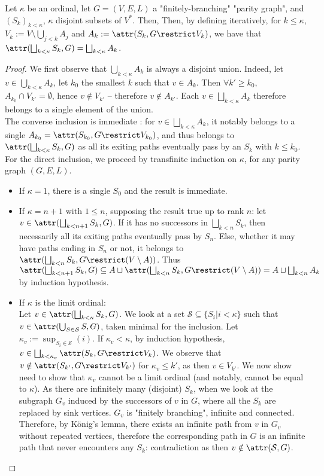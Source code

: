 \documentclass[a4paper,UKenglish,cleveref, autoref, thm-restate]{lipics-v2021}
\renewcommand{\S}{\mathcal{S}}
\renewcommand{\leq}{\leqslant}
\renewcommand{\geq}{\geqslant}
\begin{document}
\begin{lemma}\label{lem:attr-union}
	Let $\kappa$ be an ordinal, let $G=(V,E,L)$ a "finitely-branching" "parity graph", and $(S_k)_{k<\kappa}$, $\kappa$ disjoint subsets of $V^*$. Then, Then, by defining iteratively, for $k \leq \kappa$, $V_k:=V\setminus \bigcup_{j< k}A_j$ and $A_k := \attr(S_k,G\restrict V_k)$, we have that $\attr(\bigsqcup_{k<\kappa}S_k,G) = \bigsqcup_{k<\kappa} A_k$.
\end{lemma}
\begin{proof}
	We first observe that $\bigcup_{k<\kappa} A_k$ is always a disjoint union. Indeed, let $v\in \bigcup_{k<\kappa} A_k$, let $k_0$ the smallest $k$ such that $v\in A_k$. Then $\forall k' \geq k_0$, $A_{k_0} \cap V_{k'} = \emptyset$, hence $v \notin V_{k'}$ – therefore $v\notin A_{k'}$. Each $v \in \bigsqcup_{k<\kappa} A_k$ therefore belongs to a single element of the union.\\
	The converse inclusion is immediate : for $v\in \bigsqcup_{k<\kappa} A_k$, it notably belongs to a single $A_{k_0} = \attr(S_{k_0},G\restrict V_{k_0})$, and thus belongs to $\attr(\bigsqcup_{k<\kappa}S_k,G)$ as all its exiting paths eventually pass by an $S_k$ with $k\leq k_0$.\\
	For the direct inclusion, we proceed by transfinite induction on $\kappa$, for any parity graph $(G,E,L)$.
	\begin{itemize}
		\item If $\kappa = 1$, there is a single $S_0$ and the result is immediate.
		\item If $\kappa = n+1$ with $1\leq n$, supposing the result true up to rank $n$:
		let $v\in \attr(\bigsqcup_{k<n+1}S_k,G)$. If it has no successors in $\bigsqcup_{k<n}S_k$, then necessarily all its exiting paths eventually pass by $S_n$. Else, whether it may have paths ending in $S_n$ or not, it belongs to $\attr(\bigsqcup_{k<n}S_k,G\restrict (V \setminus A))$. Thus $\attr(\bigsqcup_{k<n+1}S_k,G) \subseteq A \sqcup \attr(\bigsqcup_{k<n}S_k,G\restrict (V \setminus A)) = A \sqcup \bigsqcup_{k<n} A_k$ by induction hypothesis.
		\item If $\kappa$ is the limit ordinal:\\
		Let $v \in \attr(\bigsqcup_{k<\kappa}S_k,G)$. We look at a set $\S \subseteq \{S_i|i<\kappa\}$ such that $v \in \attr(\bigcup_{S\in\S}S,G)$, taken minimal for the inclusion. Let $\kappa_v := \sup_{S_i\in \S}(i)$. If $\kappa_v < \kappa$, by induction hypothesis, $v \in \bigsqcup_{k<\kappa_v} \attr(S_k,G\restrict V_k)$. We observe that $v \notin \attr(S_{k'},G\restrict V_{k'})$ for $\kappa_v \leq k'$, as then $v \in V_{k'}$. We now show need to show that $\kappa_v$ cannot be a limit ordinal (and notably, cannot be equal to $\kappa$). As there are infinitely many (disjoint) $S_k$, when we look at the subgraph $G_v$ induced by the successors of $v$ in $G$, where all the $S_k$ are replaced by sink vertices. $G_v$ is "finitely branching", infinite and connected. Therefore, by K\"onig's lemma, there exists an infinite path from $v$ in $G_v$ without repeated vertices, therefore the corresponding path in $G$ is an infinite path that never encounters any $S_k$: contradiction as then $v\notin \attr(\S,G)$.

\end{itemize}
\end{proof}
\end{document}

